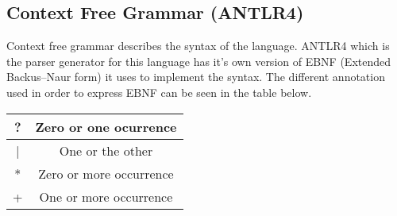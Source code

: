 \subsection{Context Free Grammar (ANTLR4)}
Context free grammar describes the syntax of the language. ANTLR4 which is the parser generator for this language has it's own version of EBNF (Extended Backus–Naur form) it uses to implement the syntax.
The different annotation used in order to express EBNF can be seen in the table below.
\begin{center}
\begin{tabular}{ |c|c| } 
 \hline
 ? & Zero or one ocurrence\\ 
 \hline
 | & One or the other \\ 
 \hline
 * & Zero or more occurrence \\ 
 \hline
  + & One or more occurrence \\ 
 \hline
\end{tabular}
\end{center}


